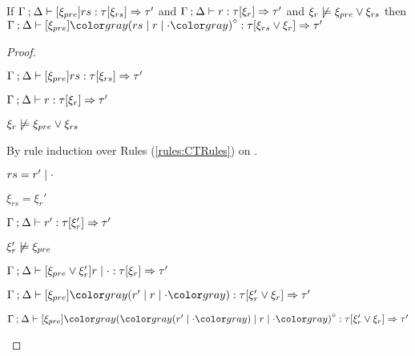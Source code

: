 \begin{lem}
  \label{lem:rule-append}
  If $\Gamma \mathbin{;} \Delta \vdash [\xi_{pre}] rs : \tau [\xi_{rs}] \Rightarrow \tau'$ and $\Gamma \mathbin{;} \Delta \vdash r : \tau [\xi_r] \Rightarrow \tau'$ and $\xi_r \not\models \xi_{pre} \vee \xi_{rs}$ then $\chrulstyp{\Gamma}{\Delta}{\xi_{pre}}{\rmpointer{\zruls{rs}{r}{\cdot}}}{\tau}{\cor{\xi_{rs}}{\xi_r}}{\tau'}$
\end{lem}
\begin{proof}
  \begin{pfsteps*}
  \item $\Gamma \mathbin{;} \Delta \vdash [\xi_{pre}] rs : \tau [\xi_{rs}] \Rightarrow \tau'$  
  \item $\Gamma \mathbin{;} \Delta \vdash r : \tau [\xi_r] \Rightarrow \tau'$  
  \item $\xi_r \not\models \xi_{pre} \vee \xi_{rs}$  
  \end{pfsteps*}
  By rule induction over Rules (\ref{rules:CTRules}) on .
  \begin{byCases}
    
  \item[\text{(\ref{rule:CTOneRules})}]
    \begin{pfsteps*}
    \item $rs = r' \mid \cdot$ 
    \item $\xi_{rs} = \xi_r'$ 
    \item $\Gamma \mathbin{;} \Delta \vdash r' : \tau [\xi_r'] \Rightarrow \tau'$  
    \item $\xi_r' \not\models \xi_{pre}$  
    \item $\Gamma \mathbin{;} \Delta \vdash [\xi_{pre} \vee \xi_r'] r \mid \cdot : \tau [\xi_r] \Rightarrow \tau'$  
    \item $\chrulstyp{\Gamma}{\Delta}{\xi_{pre}}{\hrulesP{r'}{\hrules{r}{\cdot}}}{\tau}{\cor{\xi_r'}{\xi_r}}{\tau'}$  
    \item $\chrulstyp{\Gamma}{\Delta}{\xi_{pre}}{\rmpointer{\zruls{\hrulesP{r'}{\cdot}}{r}{\cdot}}}{\tau}{\cor{\xi_r'}{\xi_r}}{\tau'}$ 
    \end{pfsteps*}


\end{byCases}
\end{proof}

